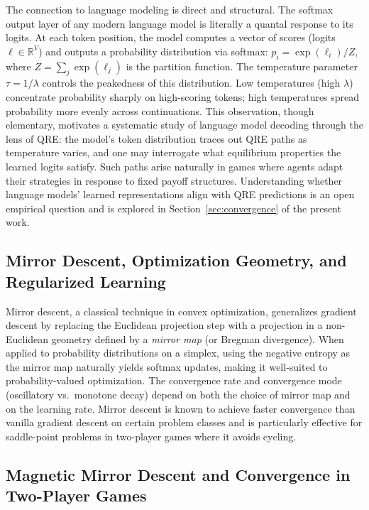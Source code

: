 The connection to language modeling is direct and structural.
The softmax output layer of any modern language model is literally a quantal response to its logits.
At each token position, the model computes a vector of scores (logits $\ell \in \mathbb{R}^V$) and outputs
a probability distribution via softmax: $p_i = \exp(\ell_i) / Z$, where $Z = \sum_j \exp(\ell_j)$ is the
partition function.
The temperature parameter $\tau = 1/\lambda$ controls the peakedness of this distribution.
Low temperatures (high $\lambda$) concentrate probability sharply on high-scoring tokens; high temperatures
spread probability more evenly across continuations.
This observation, though elementary, motivates a systematic study of language model decoding through the
lens of QRE: the model's token distribution traces out QRE paths as temperature varies, and one may
interrogate what equilibrium properties the learned logits satisfy.
Such paths arise naturally in games where agents adapt their strategies in response to fixed payoff structures.
Understanding whether language models' learned representations align with QRE predictions is an open empirical
question and is explored in Section~\ref{sec:convergence} of the present work.

\subsection{Mirror Descent, Optimization Geometry, and Regularized Learning}

Mirror descent, a classical technique in convex optimization, generalizes gradient descent by replacing the
Euclidean projection step with a projection in a non-Euclidean geometry defined by a \emph{mirror map}
(or Bregman divergence).
When applied to probability distributions on a simplex, using the negative entropy as the mirror map naturally
yields softmax updates, making it well-suited to probability-valued optimization.
The convergence rate and convergence mode (oscillatory vs.~monotone decay) depend on both the choice of
mirror map and on the learning rate.
Mirror descent is known to achieve faster convergence than vanilla gradient descent on certain problem
classes and is particularly effective for saddle-point problems in two-player games where it avoids cycling.

\subsection{Magnetic Mirror Descent and Convergence in Two-Player Games}

